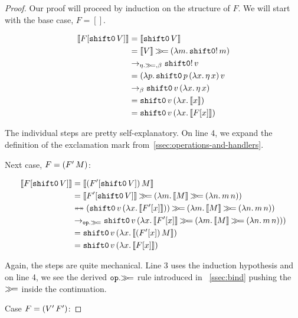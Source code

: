 \begin{proof}
Our proof will proceed by induction on the structure of $F$. We will start
with the base case, $F = []$.

\NoChapterPrefix
\begin{align}
  \llbracket F[\mathtt{shift0}\,V] \rrbracket
  &= \llbracket \mathtt{shift0}\,V \rrbracket \\
  &= \llbracket V \rrbracket \mathbin{\gg\!=} (\lambda m.\, \mathtt{shift0}!\,m) \\
  &\to_{\eta.\mathbin{\gg\!=},\beta} \mathtt{shift0}!\,v \\
  &= (\lambda p.\, \mathtt{shift0}\,p\,(\lambda x.\, \eta\,x)\,v \\
  &\to_\beta \mathtt{shift0}\,v\,(\lambda x.\, \eta\,x) \\
  &= \mathtt{shift0}\,v\,(\lambda x.\, \llbracket x \rrbracket) \\
  &= \mathtt{shift0}\,v\,(\lambda x.\, \llbracket F[x] \rrbracket)
\end{align}
\setcounter{equation}{0}
\ChapterPrefix

The individual steps are pretty self-explanatory. On line 4, we expand the
definition of the exclamation mark from~\ref{ssec:operations-and-handlers}.

Next case, $F = (F'\,M)$:

\NoChapterPrefix
\begin{align}
  \sem{F[\ap{\shifto}{V}]}
  &= \sem{\ap{(F'[\ap{\shifto}{V}])}{M}} \\
  &= \sem{F'[\ap{\shifto}{V}]} \hsbind (\lam{m}{\sem{M} \hsbind (\lam{n}{\ap{m}{n}})}) \\
  &\ttoffrom (\app{\op{shift0}}{v}{(\lam{x}{\sem{F'[x]}})}) \hsbind (\lam{m}{\sem{M} \hsbind (\lam{n}{\ap{m}{n}})}) \\
  &\to_{\op{op}.\hsbind} \app{\op{shift0}}{v}{(\lam{x}{\sem{F'[x]} \hsbind (\lam{m}{\sem{M} \hsbind (\lam{n}{\ap{m}{n}})})})} \\
  &= \app{\op{shift0}}{v}{(\lam{x}{\sem{\ap{(F'[x])}{M}}})} \\
  &= \app{\op{shift0}}{v}{(\lam{x}{\sem{F[x]}})} \\
\end{align}
\setcounter{equation}{0}
\ChapterPrefix

Again, the steps are quite mechanical. Line 3 uses the induction hypothesis
and on line 4, we see the derived $\mathtt{op}.\mathbin{\gg\!=}$ rule introduced in
~\ref{ssec:bind} pushing the $\mathbin{\gg\!=}$ inside the continuation.

Case $F = (V'\,F')$:


\end{proof}

